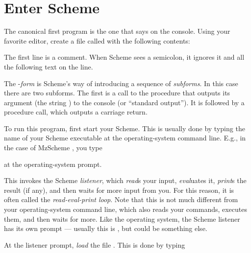 \chapter{Enter Scheme}
\label{hello}

The canonical first program is the one that says
 on the console.  Using your 
favorite editor, create a file called
 with the following contents:


\n 
{}
The first line is a comment.  When Scheme sees a
semicolon, it ignores it and all the following text on
the line.


The -{\em form} is Scheme’s way of
introducing a sequence of {\em subforms}.  In this
case there are two subforms.  The first is a call to
the 
 procedure that outputs its argument
(the string ) to the console (or
“standard output”).  It is followed by a 
procedure call, which outputs a carriage return.


To run this program, first start your Scheme.  This is
usually done by  typing the name of your Scheme
executable at the operating-system command line.
E.g., in the case of MzScheme \cite{mzscheme},
you type


\n at the operating-system prompt.


This invokes the Scheme {\em listener}, which {\em read}s
your input, {\em eval}uates it, {\em print}s the result (if
any), and then waits for more input from you.  For this
reason, it is often called the {\em read-eval-print loop}.
Note that this is not much different from your
operating-system command line, which also reads your
commands, executes them, and then waits for more.  Like the
operating system, the Scheme listener has its own prompt —
usually this is
\p{>}, but could be something else.


At the listener prompt, {\em load} the file
.  This is done by typing

